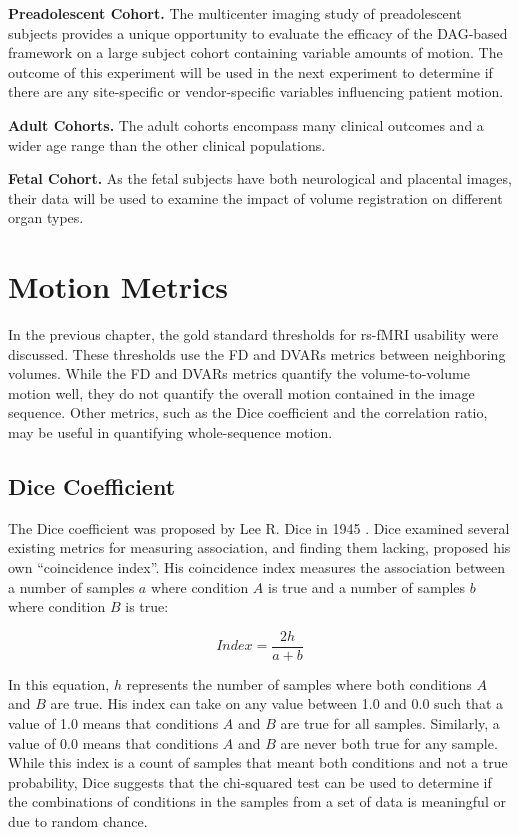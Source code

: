 \textbf{Preadolescent Cohort.} The multicenter imaging study of preadolescent subjects provides a unique opportunity to evaluate the efficacy of the DAG-based framework on a large subject cohort containing variable amounts of motion. The outcome of this experiment will be used in the next experiment to determine if there are any site-specific or vendor-specific variables influencing patient motion.

\textbf{Adult Cohorts.} The adult cohorts encompass many clinical outcomes and a wider age range than the other clinical populations. 

\textbf{Fetal Cohort.} As the fetal subjects have both neurological and placental images, their data will be used to examine the impact of volume registration on different organ types.

\section{Motion Metrics}

In the previous chapter, the gold standard thresholds for rs-fMRI usability were discussed. These thresholds use the FD and DVARs metrics between neighboring volumes. While the FD and DVARs metrics quantify the volume-to-volume motion well, they do not quantify the overall motion contained in the image sequence. Other metrics, such as the Dice coefficient and the correlation ratio, may be useful in quantifying whole-sequence motion.

\subsection{Dice Coefficient}

The Dice coefficient was proposed by Lee R. Dice in 1945 \cite{Dice1945}. Dice examined several existing metrics for measuring association, and finding them lacking, proposed his own ``coincidence index''. His coincidence index measures the association between a number of samples $a$ where condition $A$ is true and a number of samples $b$ where condition $B$ is true:

\begin{equation}
Index = \frac{2h}{a+b}
\end{equation}

In this equation, $h$ represents the number of samples where both conditions $A$ and $B$ are true. His index can take on any value between 1.0 and 0.0 such that a value of 1.0 means that conditions $A$ and $B$ are true for all samples. Similarly, a value of 0.0 means that conditions $A$ and $B$ are never both true for any sample. While this index is a count of samples that meant both conditions and not a true probability, Dice suggests that the chi-squared test can be used to determine if the combinations of conditions in the samples from a set of data is meaningful or due to random chance. 

